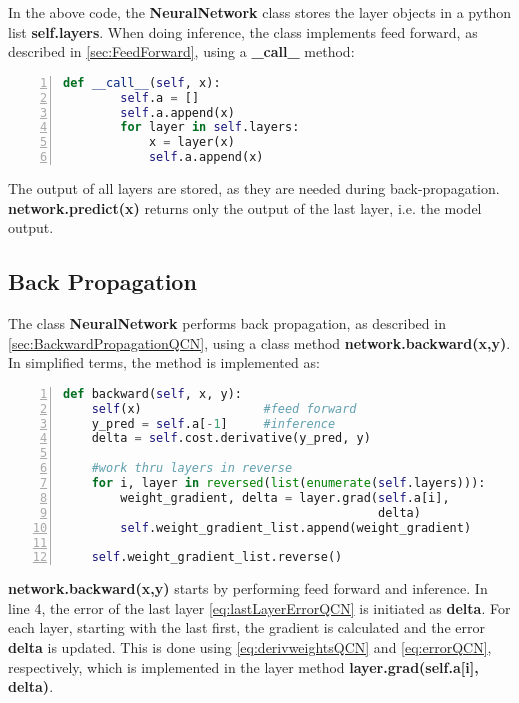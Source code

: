 In the above code, the \textbf{NeuralNetwork} class stores the layer objects in a python list \textbf{self.layers}. When doing inference, the class implements feed forward, as described in \autoref{sec:FeedForward}, using a \textbf{\_call\_} method:
\begin{lstlisting}[language=python, numbers=left]
def __call__(self, x):
        self.a = []
        self.a.append(x)
        for layer in self.layers:
            x = layer(x)
            self.a.append(x)
\end{lstlisting}
The output of all layers are stored, as they are needed during back-propagation. \textbf{network.predict(x)} returns only the output of the last layer, i.e. the model output. 

\subsection{Back Propagation}\label{sec:BackpropImplementation}

The class \textbf{NeuralNetwork} performs back propagation, as described in \autoref{sec:BackwardPropagationQCN}, using a class method \textbf{network.backward(x,y)}. In simplified terms, the method is implemented as:
\begin{lstlisting}[language=python, numbers=left]
def backward(self, x, y):
    self(x)                 #feed forward      
    y_pred = self.a[-1]     #inference
    delta = self.cost.derivative(y_pred, y)

    #work thru layers in reverse
    for i, layer in reversed(list(enumerate(self.layers))):
        weight_gradient, delta = layer.grad(self.a[i], 
                                            delta)
        self.weight_gradient_list.append(weight_gradient)

    self.weight_gradient_list.reverse()
\end{lstlisting}
\textbf{network.backward(x,y)} starts by performing feed forward and inference. In line 4, the error of the last layer \autoref{eq:lastLayerErrorQCN} is initiated as \textbf{delta}. For each layer, starting with the last first, the gradient is calculated and the error \textbf{delta} is updated. This is done using \autoref{eq:derivweightsQCN} and \autoref{eq:errorQCN}, respectively, which is implemented in the layer method \textbf{layer.grad(self.a[i], delta)}.

